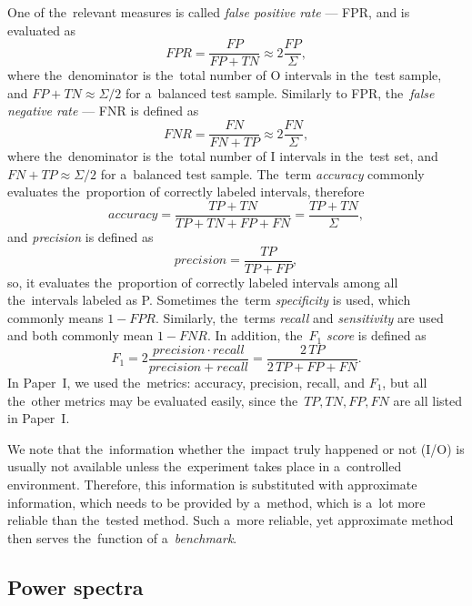 One of the~relevant measures is called \textit{false positive rate} --- FPR, and is evaluated as 
\begin{equation}
    FPR = \frac{FP}{FP+TN} \approx 2 \frac{FP}{\Sigma},
\end{equation}
where the~denominator is the~total number of O intervals in the~test sample, and $FP+TN \approx \Sigma/2$ for a~balanced test sample. Similarly to FPR, the~\textit{false negative rate} --- FNR is defined as
\begin{equation}
    FNR = \frac{FN}{FN+TP} \approx 2 \frac{FN}{\Sigma},
\end{equation}
where the~denominator is the~total number of I intervals in the~test set, and $FN+TP \approx \Sigma/2$ for a~balanced test sample. The~term \textit{accuracy} commonly evaluates the~proportion of correctly labeled intervals, therefore
\begin{equation}
    accuracy = \frac{TP + TN}{TP + TN + FP + FN} = \frac{TP + TN}{\Sigma},
\end{equation}
and \textit{precision} is defined as
\begin{equation}
    precision = \frac{TP}{TP + FP},
\end{equation}
so, it evaluates the~proportion of correctly labeled intervals among all the~intervals labeled as P. Sometimes the~term \textit{specificity} is used, which commonly means $1-FPR$. Similarly, the~terms \textit{recall} and \textit{sensitivity} are used and both commonly mean $1-FNR$. In addition, the~$F_1$ \textit{score} is defined as
\begin{equation}
    F_1 = 2\frac{precision \cdot recall}{precision + recall} = \frac{2 \, TP}{2 \, TP + FP + FN}.
\end{equation}
In Paper~I, we used the~metrics: accuracy, precision, recall, and $F_1$, but all the~other metrics may be evaluated easily, since the~$TP, TN, FP, FN$ are all listed in Paper~I. 

We note that the~information whether the~impact truly happened or not (I/O) is usually not available unless the~experiment takes place in a~controlled environment. Therefore, this information is substituted with approximate information, which needs to be provided by a~method, which is a~lot more reliable than the~tested method. Such a~more reliable, yet approximate method then serves the~function of a~\textit{benchmark}.

\subsection{Power spectra}

